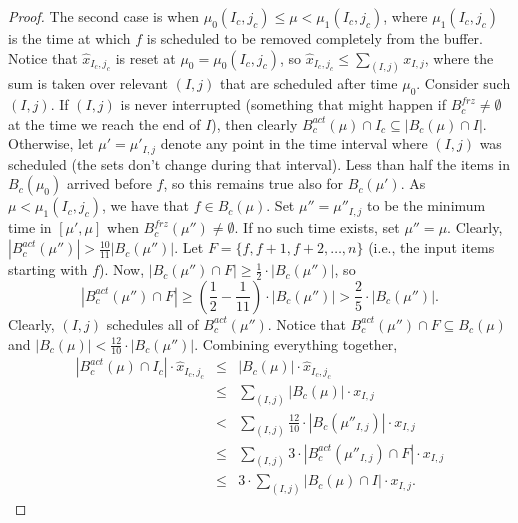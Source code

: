 \documentclass[12pt]{article}
\begin{document}
\begin{proof}
The second case is when $\mu_0(I_c,j_c)\le \mu < \mu_1(I_c,j_c)$,
where $\mu_1(I_c,j_c)$ is the time at which $f$
is scheduled to be removed completely from the buffer.
Notice that $\hat{x}_{I_c,j_c}$ is reset at $\mu_0 = \mu_0(I_c,j_c)$, 
so $\hat{x}_{I_c,j_c}\le\sum_{(I,j)} x_{I,j}$, where the sum is taken
over relevant $(I,j)$ that are scheduled after time $\mu_0$.
Consider such $(I,j)$. 
If $(I,j)$ is never interrupted (something that
might happen if $B_c^{frz}\ne\emptyset$ at the time we reach
the end of $I$), then clearly $B_c^{act}(\mu)\cap I_c\subseteq |B_c(\mu)\cap I|$.
Otherwise, let $\mu' = \mu'_{I,j}$ denote any point in the time
interval where $(I,j)$ was scheduled (the sets don't change during that
interval). Less than half the items in $B_c(\mu_0)$ arrived 
before $f$, so this remains true also for $B_c(\mu')$. 
As $\mu < \mu_1(I_c,j_c)$, we have that $f\in B_c(\mu)$.
Set $\mu'' = \mu''_{I,j}$ to be the minimum time in $[\mu',\mu]$ when
$B_c^{frz}(\mu'')\ne\emptyset$. If no such time exists, set
$\mu'' = \mu$. Clearly, $|B_c^{act}(\mu'')| > \frac{10}{11} |B_c(\mu'')|$.
Let $F = \{f,f+1,f+2,\dots,n\}$ (i.e., the input items starting
with $f$). Now, $|B_c(\mu'')\cap F|\ge \frac 1 2\cdot |B_c(\mu'')|$,
so 
$$|B_c^{act}(\mu'')\cap F|\ge\left(\frac 1 2 - \frac{1}{11}\right)\cdot |B_c(\mu'')|
> \frac 2 5\cdot |B_c(\mu'')|.
$$
Clearly, $(I,j)$ schedules all of $B_c^{act}(\mu'')$. 
Notice that 
$B_c^{act}(\mu'')\cap F\subseteq B_c(\mu)$ and
$|B_c(\mu)| < \frac{12}{10}\cdot |B_c(\mu'')|$.
Combining everything together,
\begin{eqnarray*}
            |B_c^{act}(\mu)\cap I_c|\cdot \hat{x}_{I_c,j_c} 
& \le & |B_c(\mu)|\cdot \hat{x}_{I_c,j_c} \\
& \le & \sum_{(I,j)} |B_c(\mu)|\cdot x_{I,j} \\
&  <  & \sum_{(I,j)}\frac{12}{10}\cdot |B_c(\mu''_{I,j})|\cdot x_{I,j} \\
& \le & \sum_{(I,j)} 3\cdot |B_c^{act}(\mu''_{I,j})\cap F|\cdot x_{I,j} \\ 
& \le & 3\cdot\sum_{(I,j)} |B_c(\mu)\cap I|\cdot x_{I,j}.
\end{eqnarray*}


\end{proof}
\end{document}
